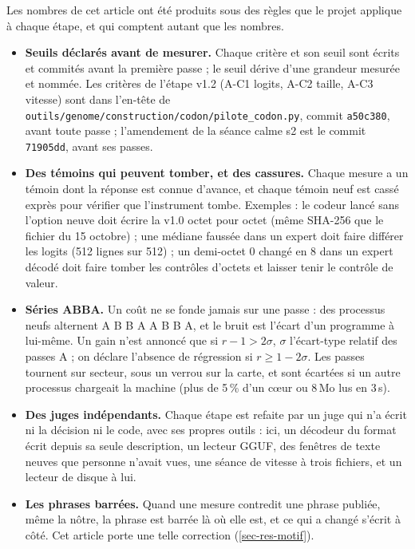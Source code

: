 \documentclass[11pt, a4paper]{article}
\theoremstyle{remark}
\newcommand{\fichier}[1]{\textsf{\footnotesize\nolinkurl{#1}}}
\begin{document}
Les nombres de cet article ont été produits sous des règles que le projet applique à chaque étape, et qui comptent autant que les nombres.
\begin{itemize}
\item \textbf{Seuils déclarés avant de mesurer.} Chaque critère et son seuil sont écrits et commités avant la première passe ; le seuil dérive d'une grandeur mesurée et nommée. Les critères de l'étape v1.2 (A-C1 logits, A-C2 taille, A-C3 vitesse) sont dans l'en-tête de \fichier{outils/genome/construction/codon/pilote\_codon.py}, commit \texttt{a50c380}, avant toute passe ; l'amendement de la séance calme s2 est le commit \texttt{71905dd}, avant ses passes.
\item \textbf{Des témoins qui peuvent tomber, et des cassures.} Chaque mesure a un témoin dont la réponse est connue d'avance, et chaque témoin neuf est cassé exprès pour vérifier que l'instrument tombe. Exemples : le codeur lancé sans l'option neuve doit écrire la v1.0 octet pour octet (même SHA-256 que le fichier du 15 octobre) ; une médiane faussée dans un expert doit faire différer les logits (512 lignes sur 512) ; un demi-octet 0 changé en 8 dans un expert décodé doit faire tomber les contrôles d'octets et laisser tenir le contrôle de valeur.
\item \textbf{Séries ABBA.} Un coût ne se fonde jamais sur une passe : des processus neufs alternent A B B A A B B A, et le bruit est l'écart d'un programme à lui-même. Un gain n'est annoncé que si $r - 1 > 2\sigma$, $\sigma$ l'écart-type relatif des passes A ; on déclare l'absence de régression si $r \ge 1 - 2\sigma$. Les passes tournent sur secteur, sous un verrou sur la carte, et sont écartées si un autre processus chargeait la machine (plus de 5\,\% d'un cœur ou 8\,Mo lus en 3\,s).
\item \textbf{Des juges indépendants.} Chaque étape est refaite par un juge qui n'a écrit ni la décision ni le code, avec ses propres outils : ici, un décodeur du format écrit depuis sa seule description, un lecteur GGUF, des fenêtres de texte neuves que personne n'avait vues, une séance de vitesse à trois fichiers, et un lecteur de disque à lui.
\item \textbf{Les phrases barrées.} Quand une mesure contredit une phrase publiée, même la nôtre, la phrase est barrée là où elle est, et ce qui a changé s'écrit à côté. Cet article porte une telle correction (\cref{sec-res-motif}).
\end{itemize}

\end{document}
